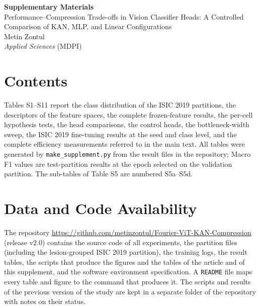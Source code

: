 \documentclass[10pt]{article}
\begin{document}
\begin{center}
{\large\bfseries Supplementary Materials}\\[4pt]
Performance--Compression Trade-offs in Vision Classifier Heads: A Controlled Comparison of KAN, MLP, and Linear Configurations\\[2pt]
Metin Zontul\\[2pt]
\textit{Applied Sciences} (MDPI)
\end{center}

\section*{Contents}
Tables S1--S11 report the class distribution of the ISIC 2019 partitions, the descriptors of the feature spaces, the complete frozen-feature results, the per-cell
hypothesis tests, the head comparisons, the control heads, the bottleneck-width sweep, the ISIC 2019 fine-tuning results at the
seed and class level, and the complete efficiency measurements referred to in the main text. All tables were generated by
\texttt{make\_supplement.py} from the result files in the repository; Macro F1 values are test-partition results at the epoch
selected on the validation partition. The sub-tables of Table S5 are numbered S5a--S5d.

\section*{Data and Code Availability}
The repository \url{https://github.com/metinzontul/Fourier-ViT-KAN-Compression} (release v2.0) contains the source code of all
experiments, the partition files (including the lesion-grouped ISIC 2019 partition), the training logs, the result tables, the
scripts that produce the figures and the tables of the article and of this supplement, and the software environment
specification. A \texttt{README} file maps every table and figure to the command that produces it. The scripts and results of
the previous version of the study are kept in a separate folder of the repository with notes on their status.
\clearpage
\end{document}
